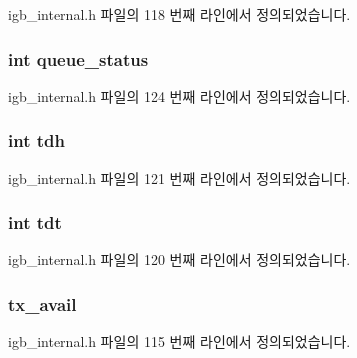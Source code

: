 igb\+\_\+internal.\+h 파일의 118 번째 라인에서 정의되었습니다.

\subsubsection[{\texorpdfstring{queue\+\_\+status}{queue_status}}]{\setlength{\rightskip}{0pt plus 5cm}int queue\+\_\+status}\hypertarget{structtx__ring_ac2917164cdb60559cb6fb4367f48ca24}{}\label{structtx__ring_ac2917164cdb60559cb6fb4367f48ca24}


igb\+\_\+internal.\+h 파일의 124 번째 라인에서 정의되었습니다.

\subsubsection[{\texorpdfstring{tdh}{tdh}}]{\setlength{\rightskip}{0pt plus 5cm}int tdh}\hypertarget{structtx__ring_a9bbc2a335ca600a3193455be30b6b03b}{}\label{structtx__ring_a9bbc2a335ca600a3193455be30b6b03b}


igb\+\_\+internal.\+h 파일의 121 번째 라인에서 정의되었습니다.

\subsubsection[{\texorpdfstring{tdt}{tdt}}]{\setlength{\rightskip}{0pt plus 5cm}int tdt}\hypertarget{structtx__ring_a243ec776558d79c629a52f9a838ad88f}{}\label{structtx__ring_a243ec776558d79c629a52f9a838ad88f}


igb\+\_\+internal.\+h 파일의 120 번째 라인에서 정의되었습니다.

\subsubsection[{\texorpdfstring{tx\+\_\+avail}{tx_avail}}]{ tx\+\_\+avail}\hypertarget{structtx__ring_a3f8acb3cacc1230f5a5b78b1b6cf7c2a}{}\label{structtx__ring_a3f8acb3cacc1230f5a5b78b1b6cf7c2a}


igb\+\_\+internal.\+h 파일의 115 번째 라인에서 정의되었습니다.

